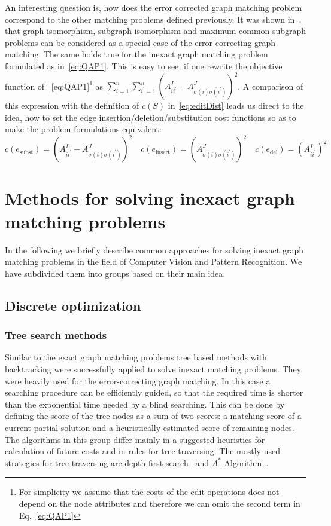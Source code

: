 An interesting question is, how does the error corrected graph matching problem correspond to the other matching problems defined previously. It was shown in~\cite{Bunke1999_UnderlyingCosts}, that graph isomorphism, subgraph isomorphism and maximum common subgraph problems can be considered as a special case of the error correcting graph matching. The same holds true for the inexact graph matching problem formulated as in~\eqref{eq:QAP1}. This is easy to see, if one rewrite the objective function of ~\eqref{eq:QAP1}\footnote{For simplicity we assume that the costs of the edit operations does not depend on the node attributes and therefore we can omit the second term in Eq.~\eqref{eq:QAP1}} as $\sum_{i=1}^n\sum_{i^\prime=1}^{n}(A^I_{ii^\prime}-A^J_{\sigma(i)\sigma(i^\prime)})^2$. A comparison of this expression with the definition of $c(S)$ in~\eqref{eq:editDist} leads us direct to the idea, how to set the edge insertion/deletion/substitution cost functions so as to make the problem formulations equivalent: 
\begin{equation*}
c(e_{\text{subst}})=(A^I_{ii^\prime}-A^J_{\sigma(i)\sigma(i^\prime)})^2\quad c(e_{\text{insert}})=(A^J_{\sigma(i)\sigma(i^\prime)})^2\quad c(e_{\text{del}})=(A^I_{ii^\prime})^2
\end{equation*}
\section{Methods for solving inexact graph matching problems}
In the following we briefly describe common approaches for solving inexact graph matching problems in the field of Computer Vision and Pattern Recognition. We have subdivided them into groups based on their main idea.
\subsection{Discrete optimization}
\subsubsection{Tree search methods}
Similar to the exact graph matching problems tree based methods with backtracking were successfully applied to solve inexact matching problems. They were heavily used for the error-correcting graph matching. In this case a searching procedure can be efficiently guided, so that the required time is shorter than the exponential time needed by a blind searching. This can be done by defining the score of the tree nodes as a sum of two scores: a matching score of a current partial solution and a heuristically estimated score of remaining nodes. The algorithms in this group differ mainly in a suggested heuristics for calculation of future costs and in rules for tree traversing. The mostly used strategies for tree traversing are depth-first-search~\cite{Cormen} and $A^*$-Algorithm~\cite{AStar}.

